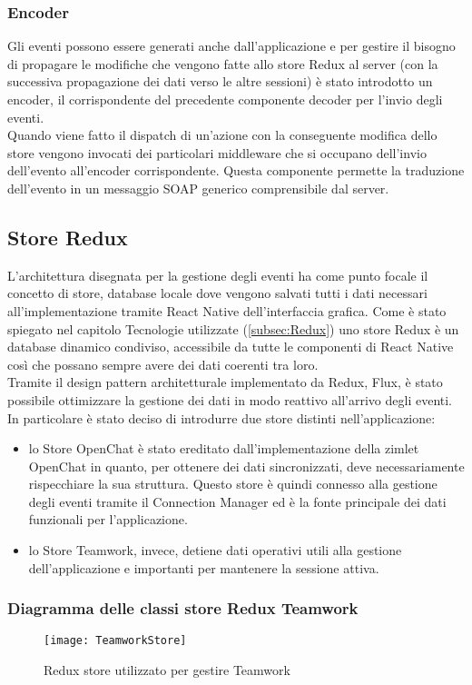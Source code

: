 \subsubsection{Encoder}
Gli eventi possono essere generati anche dall'applicazione e per gestire il bisogno di propagare le modifiche che vengono fatte allo store Redux al server (con la successiva propagazione dei dati verso le altre sessioni) è stato introdotto un encoder, il corrispondente del precedente componente decoder per l'invio degli eventi. \\
Quando viene fatto il dispatch di un'azione con la conseguente modifica dello store vengono invocati dei particolari middleware che si occupano dell'invio dell'evento all'encoder corrispondente. Questa componente permette la traduzione dell'evento in un messaggio SOAP generico comprensibile dal server.

\subsection{Store Redux}
L'architettura disegnata per la gestione degli eventi ha come punto focale il concetto di store, database locale dove vengono salvati tutti i dati necessari all'implementazione tramite React Native dell'interfaccia grafica. Come è stato spiegato nel capitolo Tecnologie utilizzate (\ref{subsec:Redux}) uno store Redux è un database dinamico condiviso, accessibile da tutte le componenti di React Native così che possano sempre avere dei dati coerenti tra loro. \\
Tramite il design pattern architetturale implementato da Redux, Flux, è stato possibile ottimizzare la gestione dei dati in modo reattivo all'arrivo degli eventi. \\
In particolare è stato deciso di introdurre due store distinti nell'applicazione:
\begin{itemize}
	\item lo Store OpenChat è stato ereditato dall'implementazione della zimlet OpenChat in quanto, per ottenere dei dati sincronizzati, deve necessariamente rispecchiare la sua struttura. Questo store è quindi connesso alla gestione degli eventi tramite il Connection Manager ed è la fonte principale dei dati funzionali per l'applicazione.
	\item lo Store Teamwork, invece, detiene dati operativi utili alla gestione dell'applicazione e importanti per mantenere la sessione attiva.
\end{itemize} 
\subsubsection{Diagramma delle classi store Redux Teamwork}
\begin{figure}[H] 
	\centering
	\texttt{[image: TeamworkStore]}
	\caption{Redux store utilizzato per gestire Teamwork}
\end{figure}

